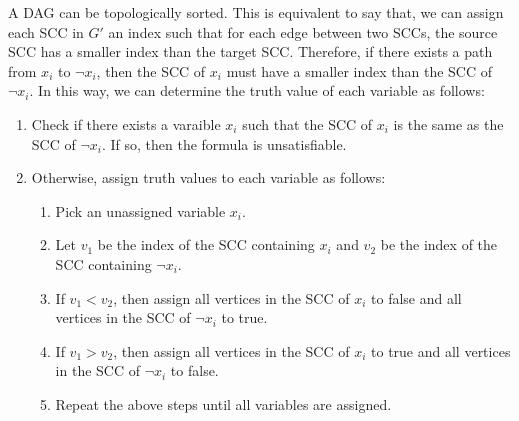 \documentclass[a4paper,12pt]{article}
\begin{document}
A DAG can be topologically sorted.
This is equivalent to say that, we can assign each SCC in $G'$ an index such that for each edge between two SCCs, the source SCC has a smaller index than the target SCC.
Therefore, if there exists a path from $x_i$ to $\neg x_i$, then the SCC of $x_i$ must have a smaller index than the SCC of $\neg x_i$.
In this way, we can determine the truth value of each variable as follows:
\begin{enumerate}
	\item Check if there exists a varaible $x_i$ such that the SCC of $x_i$ is the same as the SCC of $\neg x_i$.
		If so, then the formula is unsatisfiable.
	\item Otherwise, assign truth values to each variable as follows:
		\begin{enumerate}
			\item Pick an unassigned variable $x_i$.
			\item Let $v_1$ be the index of the SCC containing $x_i$ and $v_2$ be the index of the SCC containing $\neg x_i$.
			\item If $v_1 < v_2$, then assign all vertices in the SCC of $x_i$ to false and all vertices in the SCC of $\neg x_i$ to true.
			\item If $v_1 > v_2$, then assign all vertices in the SCC of $x_i$ to true and all vertices in the SCC of $\neg x_i$ to false.
			\item Repeat the above steps until all variables are assigned.
		\end{enumerate}
\end{enumerate}
\end{document}
